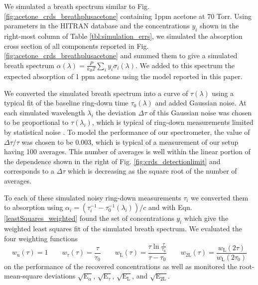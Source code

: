 \documentclass[12pt]{report}
\begin{document}
	We simulated a breath spectrum similar to Fig. \ref{fig:acetone_crds_breathplusacetone} containing 1ppm acetone at 70 Torr. Using parameters in the HITRAN database \cite{hitran_2020} and the concentrations $y_i$ shown in the right-most column of Table \ref{tbl:simulation_errs}, we simulated the absorption cross section of all components reported in Fig. \ref{fig:acetone_crds_breathplusacetone} and summed them to give a simulated breath spectrum $\alpha(\lambda) = \frac{P}{k_B T}\sum_{i}y_i\sigma_i(\lambda)$. We added to this spectrum the expected absorption of 1 ppm acetone using the model reported in this paper.
	
	We converted the simulated breath spectrum into a curve of $\tau(\lambda)$ using a typical fit of the baseline ring-down time $\tau_0(\lambda)$ and added Gaussian noise. At each simulated wavelength $\lambda_i$ the deviation $\Delta \tau$ of this Gaussian noise was chosen to be proportional to $\tau(\lambda_i)$, which is typical of ring-down measurements limited by statistical noise \cite{vanZee_1999}. To model the performance of our spectrometer, the value of $\Delta \tau / \tau$ was chosen to be 0.003, which is typical of a measurement of our setup having 100 averages. This number of averages is well within the linear portion of the dependence shown in the right of Fig. \ref{fig:crds_detectionlimit} and corresponds to a $\Delta \tau$ which is decreasing as the square root of the number of averages.
	
	To each of these simulated noisy ring-down measurements $\tau_i$ we converted them to absorption using $\alpha_i = (\tau_i^{-1}-\tau_0^{-1}(\lambda_i))/c$ and with Eqn. \ref{leastSquares_weighted} found the set of concentrations $y_i$ which give the weighted least squares fit of the simulated breath spectrum. We evaluated the four weighting functions
	\begin{equation*}
		w_\mathrm{u}(\tau) = 1 \qquad
		w_\tau(\tau) = \frac{\tau}{\tau_0} \qquad
		w_\mathrm{L}(\tau) = \frac{\tau\ln\frac{\tau}{\tau_0}}{\tau-\tau_0} \qquad
		w_\mathrm{2L}(\tau) = \frac{w_\mathrm{L}(2\tau)}{w_\mathrm{L}(2\tau_0)}
	\end{equation*}
	on the performance of the recovered concentrations as well as monitored the root-mean-square deviations $\sqrt{\mathrm{E}_{\alpha}}$, $\sqrt{\mathrm{E}_{\tau}}$, $\sqrt{\mathrm{E}_{\mathrm{L}}}$, and $\sqrt{\mathrm{E}_{\mathrm{2L}}}$.
	
\end{document}
